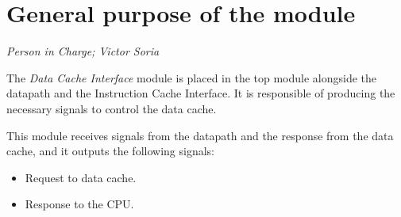 \newpage
\section{General purpose of the module}
\textit{Person in Charge; Victor Soria}

The \textit{Data Cache Interface} module is placed in the top module alongside the datapath and the Instruction Cache Interface.
It is responsible of producing the necessary signals to control the data cache.

This module receives signals from the datapath and the response from the data cache, and it outputs the following signals:

\begin{itemize}
    \item Request to data cache.
    \item Response to the CPU.
\end{itemize}
